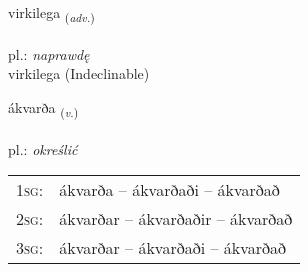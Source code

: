 \documentclass[frontgrid, backgrid]{flacards}\usepackage[]{graphicx}\usepackage[]{xcolor}
\begin{document}

\renewcommand{\flhead}{\vskip5pt \fboxsep=0pt {\small\bfseries\footnotesize Atviksorð | przysłówek}}
\renewcommand{\fcfoot}{\vskip5pt \fboxsep=0pt \hspace{2pt}{\small\bfseries\footnotesize 3K}}

\renewcommand{\blhead}{\vskip5pt {\small\bfseries\footnotesize Atviksorð | przysłówek }}
\renewcommand{\bcfoot}{\vskip5pt \hspace{2pt}{\small\bfseries\footnotesize 3K}}


{virkilega \small{\textsubscript{(\textit{adv.})}} \\[1ex]
 \\
pl.: \emph{naprawdę} \\  [2ex]
virkilega (Indeclinable)}

\renewcommand{\flhead}{\vskip5pt \fboxsep=0pt {\small\bfseries\footnotesize Sagnorð | czasownik}}
\renewcommand{\fcfoot}{\vskip5pt \fboxsep=0pt \hspace{2pt}{\small\bfseries\footnotesize 3K}}

\renewcommand{\blhead}{\vskip5pt {\small\bfseries\footnotesize Sagnorð | czasownik }}
\renewcommand{\bcfoot}{\vskip5pt \hspace{2pt}{\small\bfseries\footnotesize 3K}}


{ákvarða \small{\textsubscript{(\textit{v.})}} \\[1ex] %
\textphonetic{[auːkʰvarða]} \\
pl.: \emph{określić} \\  [2ex]
\renewcommand*{\arraystretch}{0.8}
\begin{tabular}{p{1cm}l}
\textsc{1sg}: & ákvarða -- ákvarðaði -- ákvarðað \\ 
\textsc{2sg}: & ákvarðar -- ákvarðaðir -- ákvarðað \\ 
\textsc{3sg}: & ákvarðar -- ákvarðaði -- ákvarðað \\ 
\end{tabular}
}
\end{document}
